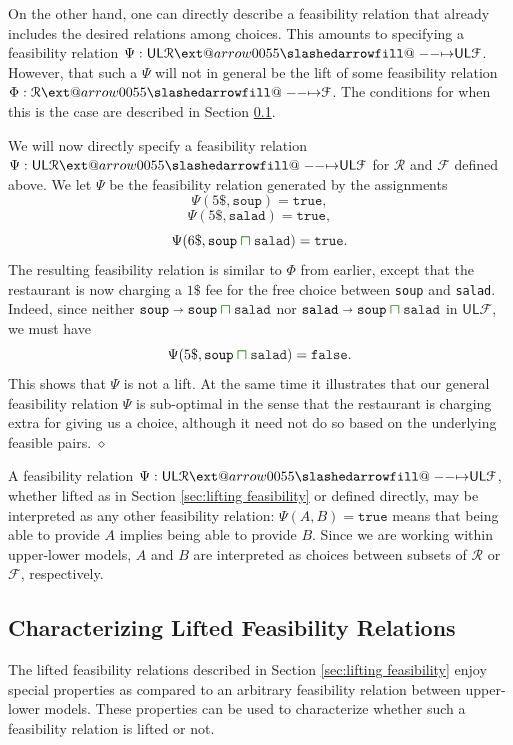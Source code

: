 \documentclass[12pt]{article}
\makeatletter
\theoremstyle{definition}
\theoremstyle{plain}
\theoremstyle{plain}
\theoremstyle{plain}
\theoremstyle{plain}
\theoremstyle{remark}
\newcommand{\continuation}{??}
\newenvironment{continueexample}[1]
{\renewcommand{\continuation}{\ref{#1}}\excont[continued]}
{\endexcont}
\newcommand\xqed[1]{%
	\leavevmode\unskip\penalty9999 \hbox{}\nobreak\hfill
	\quad\hbox{#1}}
\newcommand\exampleend{\xqed{$\diamond$}}
\theoremstyle{remark}
\newcommand{\mc}[1]{\mathcal{#1}}
\newcommand{\low}{\mathsf{L}}
\newcommand{\upper}{\mathsf{U}}
\newcommand{\true}{\mathtt{true}}
\newcommand{\false}{\mathtt{false}}
\def\slashedarrowfill@#1#2#3#4#5{%
	$\m@th\thickmuskip0mu\medmuskip\thickmuskip\thinmuskip\thickmuskip
	\relax#5#1\mkern-7mu%
	\cleaders\hbox{$#5\mkern-2mu#2\mkern-2mu$}\hfill
	\mathclap{#3}\mathclap{#2}%
	\cleaders\hbox{$#5\mkern-2mu#2\mkern-2mu$}\hfill
	\mkern-7mu#4$%
}
\def\rightslashedarrowfill@{%
	\slashedarrowfill@\relbar\relbar\mapstochar\rightarrow}
\newcommand\xslashedrightarrow[2][]{%
	\ext@arrow 0055{\rightslashedarrowfill@}{#1}{#2}}
\newcommand{\csqcap}{\color{OliveGreen}\bm{\sqcap}\color{Black}}
\makeatother
\begin{document}
On the other hand, one can directly describe a feasibility relation that already includes the desired relations among choices. This amounts to specifying a feasibility relation $\Psi: \upper\low\mc{R} \xslashedrightarrow{} \upper\low\mc{F}$. However, that such a $\Psi$ will not in general be the lift of some feasibility relation $\Phi: \mc{R} \xslashedrightarrow{} \mc{F}$. The conditions for when this is the case are described in Section \ref{sec:characterizing feas}.

\begin{continueexample}{ex:double order}
	We will now directly specify a feasibility relation $\Psi: \upper\low\mc{R} \xslashedrightarrow{} \upper\low\mc{F}$ for $\mc{R}$ and $\mc{F}$ defined above. We let $\Psi$ be the feasibility relation generated by the assignments
	$$ \Psi(5\$, \mathtt{soup}) = \true,$$
	$$ \Psi(5\$, \mathtt{salad}) = \true,$$
	$$ \Psi(6\$, \mathtt{soup} \csqcap \mathtt{salad}) = \true.$$
	The resulting feasibility relation is similar to $\Phi$ from earlier, except that the restaurant is now charging a $1\$$ fee for the free choice between \texttt{soup} and \texttt{salad}. Indeed, since neither $\mathtt{soup} \shortrightarrow \mathtt{soup} \csqcap \mathtt{salad}$ nor $\mathtt{salad} \shortrightarrow \mathtt{soup} \csqcap \mathtt{salad}$ in $\upper\low\mc{F}$, we must have
	$$ \Psi(5\$, \mathtt{soup} \csqcap \mathtt{salad}) = \false.$$
	This shows that $\Psi$ is not a lift. At the same time it illustrates that our general feasibility relation $\Psi$ is sub-optimal in the sense that the restaurant is charging extra for giving us a choice, although it need not do so based on the underlying feasible pairs. \exampleend
\end{continueexample}

\begin{tcolorbox}[title=Feasibility between Upper-Lower Models, colframe=Apricot, colback = paleorange, coltitle = Sepia]
	A feasibility relation $\Psi: \upper\low\mc{R} \xslashedrightarrow{} \upper\low\mc{F}$, whether lifted as in Section \ref{sec:lifting feasibility} or defined directly, may be interpreted as any other feasibility relation: $\Psi(A,B) = \true$ means that being able to provide $A$ implies being able to provide $B$. Since we are working within upper-lower models, $A$ and $B$ are interpreted as choices between subsets of $\mc{R}$ or $\mc{F}$, respectively.
\end{tcolorbox}

\subsection{Characterizing Lifted Feasibility Relations}\label{sec:characterizing feas}
The lifted feasibility relations described in Section \ref{sec:lifting feasibility} enjoy special properties as compared to an arbitrary feasibility relation between upper-lower models. These properties can be used to characterize whether such a feasibility relation is lifted or not. 
\end{document}

